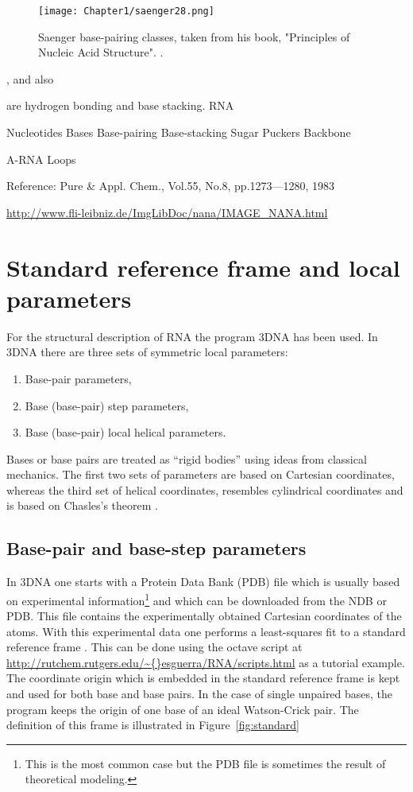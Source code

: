 \begin{figure}
\centering
\texttt{[image: Chapter1/saenger28.png]}
\caption{Saenger base-pairing classes, taken from his book, "Principles of
Nucleic Acid Structure". \cite{saenger1984}.}
\label{fig:saenger28}
\end{figure}  


, and also 

are hydrogen bonding and
base stacking. RNA 

Nucleotides
 Bases
  Base-pairing
  Base-stacking
Sugar
  Puckers
Backbone

A-RNA 
Loops

Reference:
Pure \& Appl. Chem., Vol.55, No.8, pp.1273—1280, 1983

\url{http://www.fli-leibniz.de/ImgLibDoc/nana/IMAGE_NANA.html}


\section{Standard reference frame and local parameters}
For  the  structural  description  of RNA  the  program  \textsf{3DNA}
\cite{lu2003} has been used.  In \textsf{3DNA} there are three sets of
symmetric local parameters:
\begin{enumerate}
\item Base-pair parameters,
\item Base (base-pair) step parameters,
\item Base (base-pair) local helical parameters.
\end{enumerate}
Bases or base  pairs are treated as ``rigid  bodies'' using ideas from
classical mechanics.
The first two  sets of parameters are based  on Cartesian coordinates,
whereas the  third set  of helical coordinates,  resembles cylindrical
coordinates and is based on Chasles's theorem \cite{babcock1994}.

\subsection{Base-pair and base-step parameters}
In  \textsf{3DNA}   one  starts  with   a  Protein  Data   Bank  (PDB)
\cite{berman2000}  file   which  is  usually   based  on  experimental
information\footnote{This is the most common  case but the PDB file is
  sometimes  the result of  theoretical modeling.}   and which  can be
downloaded from the NDB or  PDB. This file contains the experimentally
obtained Cartesian  coordinates of  the atoms. With  this experimental
data one  performs a least-squares  fit to a standard  reference frame
\cite{olson2001}. This can be done using the \textsf{octave} script at
\url{http://rutchem.rutgers.edu/\~{}esguerra/RNA/scripts.html}   as  a
tutorial  example.  The  coordinate origin  which is  embedded  in the
standard  reference frame  is kept  and used  for both  base  and base
pairs.  In  the case of single  unpaired bases, the  program keeps the
origin of one  base of an ideal Watson-Crick  pair.  The definition of
this frame is illustrated in Figure~\ref{fig:standard}

